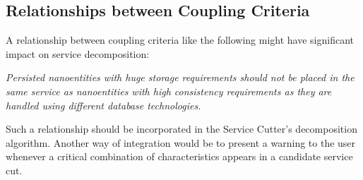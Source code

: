 \subsection{Relationships between Coupling Criteria}

A relationship between coupling criteria like the following might have significant impact on service decomposition:

\textit{Persisted nanoentities with huge storage requirements should not be placed in the same service as nanoentities with high consistency requirements as they are handled using different database technologies.}

Such a relationship should be incorporated in the Service Cutter's decomposition algorithm. Another way of integration would be to present a warning to the user whenever a critical combination of characteristics appears in a candidate service cut.





